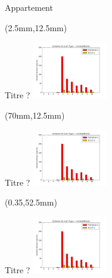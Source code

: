 \documentclass[10pt]{beamer}
\begin{document}
	\begin{frame}{Appartement}

		\begin{textblock*}{60mm}(2.5mm,12.5mm)
			\begin{block}{Titre ?}
				\includegraphics[width=125px]{../src/data/itinary_1/var_ecart_sat_x.png}
			\end{block}
		\end{textblock*}

		\begin{textblock*}{60mm}(70mm,12.5mm)
			\begin{block}{Titre ?}
				\includegraphics[width=125px]{../src/data/itinary_1/var_ecart_sat_x.png}
			\end{block}
		\end{textblock*}

		\begin{textblock*}{60mm}(0.35\textwidth,52.5mm)
			\begin{block}{Titre ?}
				\includegraphics[width=125px]{../src/data/itinary_1/var_ecart_sat_x.png}
			\end{block}
		\end{textblock*}
	\end{frame}
\end{document}
